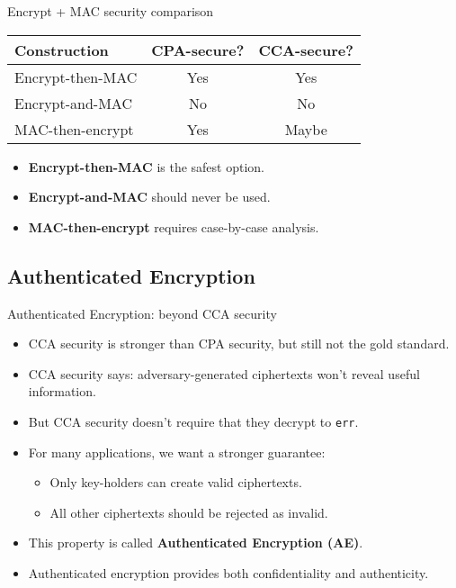 \documentclass[aspectratio=169, lualatex, handout]{beamer}
\begin{document}
\begin{frame}{Encrypt + MAC security comparison}
	\begin{center}
		\begin{tabular}{|l|c|c|}
			\hline
			\textbf{Construction} & \textbf{CPA-secure?} & \textbf{CCA-secure?} \\
			\hline
			Encrypt-then-MAC      & Yes                  & Yes                  \\
			\hline
			Encrypt-and-MAC       & No                   & No                   \\
			\hline
			MAC-then-encrypt      & Yes                  & Maybe                \\
			\hline
		\end{tabular}
	\end{center}
	\vspace{1em}
	\begin{itemize}
		\item \textbf{Encrypt-then-MAC} is the safest option.
		\item \textbf{Encrypt-and-MAC} should never be used.
		\item \textbf{MAC-then-encrypt} requires case-by-case analysis.
	\end{itemize}
\end{frame}

\subsection{Authenticated Encryption}

\begin{frame}{Authenticated Encryption: beyond CCA security}
	\begin{itemize}
		\item CCA security is stronger than CPA security, but still not the gold standard.
		\item CCA security says: adversary-generated ciphertexts won't reveal useful information.
		\item But CCA security doesn't require that they decrypt to \texttt{err}.
		\item For many applications, we want a stronger guarantee:
		      \begin{itemize}
			      \item Only key-holders can create valid ciphertexts.
			      \item All other ciphertexts should be rejected as invalid.
		      \end{itemize}
		\item This property is called \textbf{Authenticated Encryption (AE)}.
		\item Authenticated encryption provides both confidentiality and authenticity.
	\end{itemize}
\end{frame}
\end{document}
